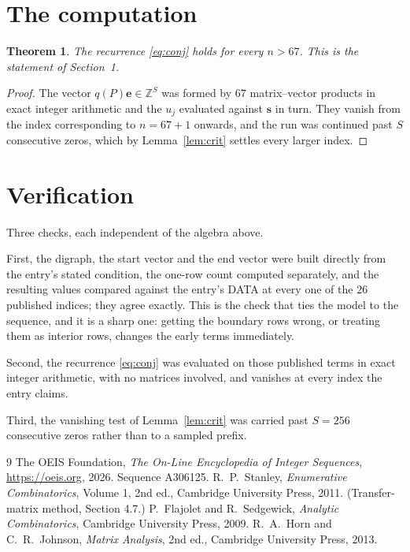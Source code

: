 \documentclass[11pt,a4paper]{article}
\theoremstyle{plain}
\newtheorem{theorem}{Theorem}
\theoremstyle{definition}
\begin{document}
\section{The computation}

\begin{theorem}
The recurrence \eqref{eq:conj} holds for every $n>67$. This is the statement of
Section~1.
\end{theorem}

\begin{proof}
The vector $q(P)\mathbf{e}\in\mathbb{Z}^{S}$ was formed by $67$ matrix--vector
products in exact integer arithmetic and the $u_j$ evaluated against $\mathbf{s}$ in turn.
They vanish from the index corresponding to $n=67+1$ onwards, and the run was continued
past $S$ consecutive zeros, which by Lemma~\ref{lem:crit} settles every larger index.
\end{proof}

\section{Verification}

Three checks, each independent of the algebra above.

First, the digraph, the start vector and the end vector were built directly from the
entry's stated condition, the one-row count computed separately, and the resulting values
compared against the entry's DATA at every one of the $26$ published indices; they
agree exactly. This is the check that ties the model to the sequence, and it is a sharp one:
getting the boundary rows wrong, or treating them as interior rows, changes the early terms
immediately.

Second, the recurrence \eqref{eq:conj} was evaluated on those published terms in exact
integer arithmetic, with no matrices involved, and vanishes at every index the entry claims.

Third, the vanishing test of Lemma~\ref{lem:crit} was carried past $S=256$ consecutive
zeros rather than to a sampled prefix.

\begin{thebibliography}{9}
 The OEIS Foundation, \emph{The On-Line Encyclopedia of Integer
Sequences}, \url{https://oeis.org}, 2026. Sequence A306125.
 R.~P.~Stanley, \emph{Enumerative Combinatorics}, Volume 1, 2nd ed.,
Cambridge University Press, 2011. (Transfer-matrix method, Section 4.7.)
 P.~Flajolet and R.~Sedgewick, \emph{Analytic Combinatorics}, Cambridge
University Press, 2009.
 R.~A.~Horn and C.~R.~Johnson, \emph{Matrix Analysis}, 2nd ed., Cambridge
University Press, 2013.
\end{thebibliography}
\end{document}
